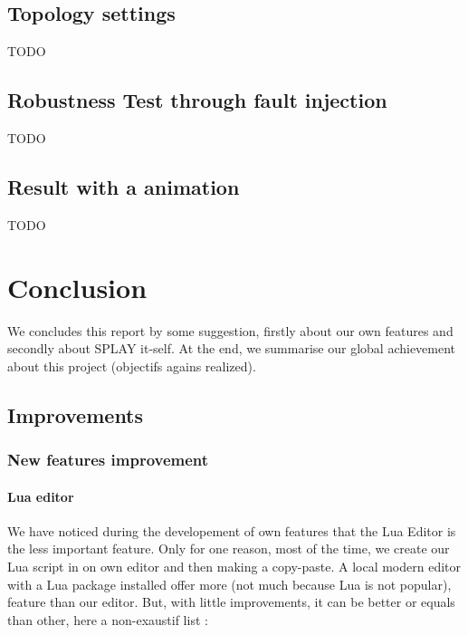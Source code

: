 \documentclass{eplmastersthesis}
\begin{document}
    \section{Topology settings}

    {\color{red} TODO}

    \section{Robustness Test through fault injection}


    {\color{red} TODO}

    \section{Result with a animation}
    {\color{red} TODO}


  \chapter{Conclusion}
    We concludes this report by some suggestion, firstly about our own features and secondly about
    SPLAY it-self. At the end, we summarise our global achievement about this project (objectifs agains realized).

    \section{Improvements}

      \subsection{New features improvement}

        \subsubsection{Lua editor}

        We have noticed during the developement of own features that the Lua Editor is  
        the less important feature. Only for one reason, most of the time, we 
        create our Lua script in on own editor and then making a copy-paste.  
        A local modern editor with a Lua package installed offer more (not much because Lua is not popular),
        feature than our editor. But, with little improvements, it can be better or equals than other, 
        here a non-exaustif list :
\end{document}
